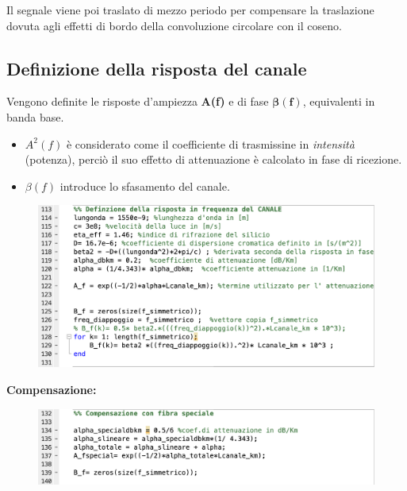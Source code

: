 \documentclass[12pt, a4paper]{article}
\begin{document}
Il segnale viene poi traslato di mezzo periodo per compensare la traslazione dovuta agli effetti di bordo della convoluzione circolare con il coseno.


\newpage
\subsection{Definizione della risposta del canale}
\label{sub:canalamatlab}


Vengono definite le risposte d'ampiezza \textbf{A(f)} e di fase $\boldsymbol{\beta(f)}$, equivalenti in banda base. 

\begin{itemize}
	\item $A^2(f)$ è considerato come il coefficiente di trasmissine in \textit{intensità} (potenza), perciò il suo effetto di attenuazione è calcolato in fase di ricezione.
	\item $\beta(f)$ introduce lo sfasamento del canale. 
\end{itemize}

\begin{figure}[h!]
\centering
\includegraphics[scale=0.7]{definizionecanal.png}
\caption{}
\label{}
\end{figure}

\textbf{Compensazione:}

\begin{figure}[h!]
\centering
\includegraphics[scale=0.7]{compensazione.png}
\caption{}
\label{}
\end{figure}
\end{document}
